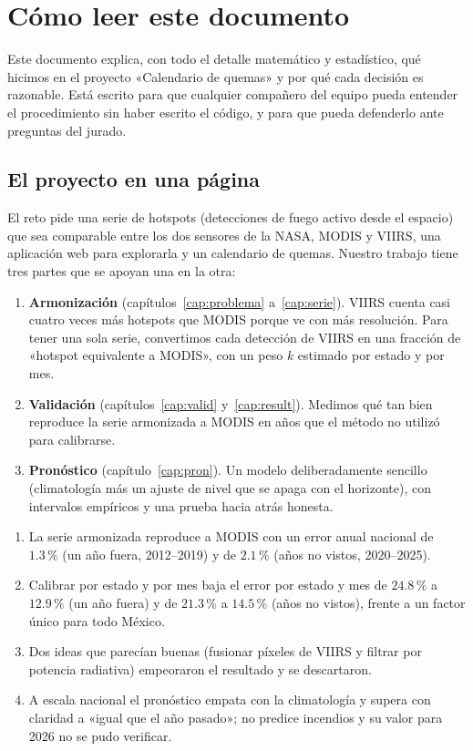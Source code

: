 \chapter{Cómo leer este documento}

Este documento explica, con todo el detalle matemático y estadístico, qué hicimos en el proyecto «Calendario de quemas» y por qué cada decisión es razonable. Está escrito para que cualquier compañero del equipo pueda entender el procedimiento sin haber escrito el código, y para que pueda defenderlo ante preguntas del jurado.

\section{El proyecto en una página}

El reto pide una serie de hotspots (detecciones de fuego activo desde el espacio) que sea comparable entre los dos sensores de la NASA, MODIS y VIIRS, una aplicación web para explorarla y un calendario de quemas. Nuestro trabajo tiene tres partes que se apoyan una en la otra:

\begin{enumerate}[label=\arabic*)]
  \item \textbf{Armonización} (capítulos~\ref{cap:problema} a~\ref{cap:serie}). VIIRS cuenta casi cuatro veces más hotspots que MODIS porque ve con más resolución. Para tener una sola serie, convertimos cada detección de VIIRS en una fracción de «hotspot equivalente a MODIS», con un peso $k$ estimado por estado y por mes.
  \item \textbf{Validación} (capítulos~\ref{cap:valid} y~\ref{cap:result}). Medimos qué tan bien reproduce la serie armonizada a MODIS en años que el método no utilizó para calibrarse.
  \item \textbf{Pronóstico} (capítulo~\ref{cap:pron}). Un modelo deliberadamente sencillo (climatología más un ajuste de nivel que se apaga con el horizonte), con intervalos empíricos y una prueba hacia atrás honesta.
\end{enumerate}

\begin{ideaclave}
\begin{enumerate}[label=\arabic*.]
  \item La serie armonizada reproduce a MODIS con un error anual nacional de $1.3\,\%$ (un año fuera, 2012--2019) y de $2.1\,\%$ (años no vistos, 2020--2025).
  \item Calibrar por estado y por mes baja el error por estado y mes de $24.8\,\%$ a $12.9\,\%$ (un año fuera) y de $21.3\,\%$ a $14.5\,\%$ (años no vistos), frente a un factor único para todo México.
  \item Dos ideas que parecían buenas (fusionar píxeles de VIIRS y filtrar por potencia radiativa) empeoraron el resultado y se descartaron.
  \item A escala nacional el pronóstico empata con la climatología y supera con claridad a «igual que el año pasado»; no predice incendios y su valor para 2026 no se pudo verificar.
\end{enumerate}
\end{ideaclave}

